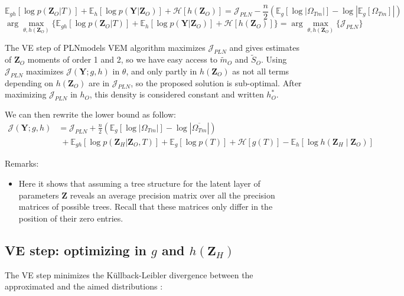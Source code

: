 \documentclass[11pt,a4paper]{article}
\newcommand{\argmax}{\arg\!\max}
\newcommand{\entr}{\mathcal{H}}
\newcommand{\Ybf}{\boldsymbol{Y}}
\newcommand{\Zbf}{\boldsymbol{Z}}
\newcommand{\Esp}{\mathds{E}}
\begin{document}
 $$\Esp_{gh}[\log p(\Zbf_O | T)] +\Esp_h[\log p(\Ybf|\Zbf_O)]+ \entr[h(\Zbf_O)] = \mathcal{J}_{PLN} - \frac{n}{2}\left( \Esp_g[\log|\Omega_{Tm}|] - \log|\Esp_g [\Omega_{Tm}]|\right)$$
 $$ \argmax_{\theta, h(\Zbf_O)} \big\{\Esp_{gh}[\log p(\Zbf_O | T)] +\Esp_h[\log p(\Ybf|\Zbf_O)]+ \entr[h(\Zbf_O)]\big\} = \argmax_{\theta, h(\Zbf_O)} \big\{ \mathcal{J}_{PLN} \big\}$$

The VE step of PLNmodels VEM algorithm maximizes $\mathcal{J}_{PLN}$ and gives estimates of $\Zbf_O$ moments of order 1 and 2, so we have easy access to $\widetilde{m}_O$ and $\widetilde{S}_O$. Using $\mathcal{J}_{PLN}$ maximizes  $\mathcal{J}(\Ybf;g,h)$ in $\theta$, and only partly in $h(\Zbf_O)$ as not all terms depending on $h(\Zbf_O)$ are in $\mathcal{J}_{PLN}$, so the proposed solution is sub-optimal. After maximizing $\mathcal{J}_{PLN}$ in $h_O$, this density is considered constant and written $h_O^*$.  

We can then rewrite the lower bound as follow:
\begin{align*}
\mathcal{J}(\Ybf; g,h)&= \mathcal{J}_{PLN}+\frac{n}{2}\left(\Esp_g[\log|\Omega_{Tm}|] - \log|\overline{\Omega_{Tm}}|\right)\\
&\;+ \Esp_{gh}[\log p(\Zbf_H | \Zbf_O,T) ]+\Esp_g[\log p(T)] +\entr[g(T)]-\Esp_h[\log h(\Zbf_H\mid \Zbf_O)]
\end{align*}

 

Remarks:
\begin{itemize}
\item Here it shows that assuming a tree structure for the latent layer of parameters $\Zbf$ reveals an average precision matrix over all the precision matrices of possible trees. Recall that these matrices only differ in the position of their zero entries.

\end{itemize}




\subsection{VE step: optimizing in $g$ and $h(\Zbf_H)$}
The VE step minimizes the Küllback-Leibler divergence between the approximated and the aimed distributions :
\end{document}
